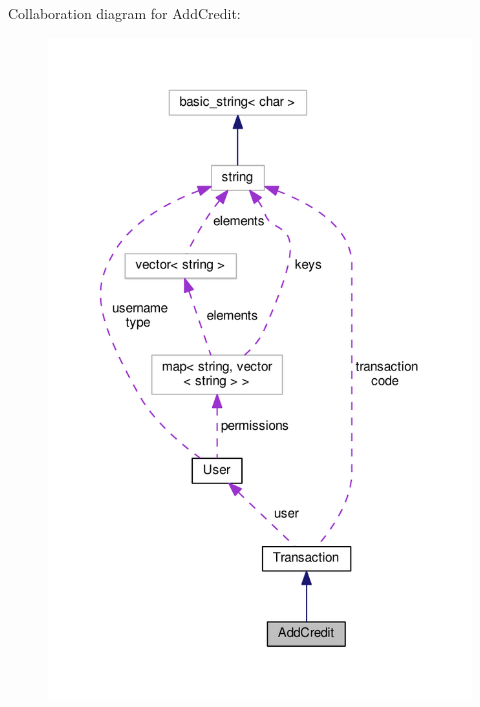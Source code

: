 Collaboration diagram for Add\-Credit\-:\nopagebreak
\begin{figure}[H]
\begin{center}
\leavevmode
\includegraphics[width=327pt]{class_add_credit__coll__graph}
\end{center}
\end{figure}
